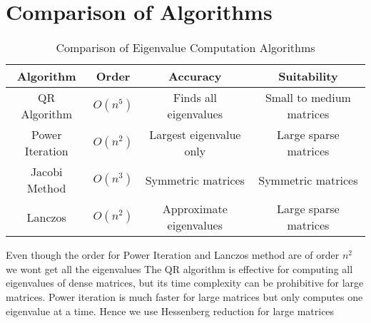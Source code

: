 \documentclass[journal]{IEEEtran}
\begin{document}
\section{\textbf{Comparison of Algorithms}}
\begin{table}[h]
\centering
\begin{tabular}{|c|c|c|c|}
\hline
\textbf{Algorithm} & \textbf{  Order  } & \textbf{Accuracy} & \textbf{Suitability} \\
\hline
QR Algorithm & \( O(n^5) \) & Finds all eigenvalues & Small to medium matrices \\
\hline
Power Iteration & \( O(n^2) \) & Largest eigenvalue only & Large sparse matrices \\
\hline
Jacobi Method & \( O(n^3) \) & Symmetric matrices & Symmetric matrices \\
\hline
Lanczos & \( O(n^2) \) & Approximate eigenvalues & Large sparse matrices \\
\hline
\end{tabular}
\caption{Comparison of Eigenvalue Computation Algorithms}
\end{table}
Even though the order for Power Iteration and Lanczos method are of order $n^2$ we wont get all the eigenvalues 
The QR algorithm is effective for computing all eigenvalues of dense matrices, but its time complexity can be prohibitive for large matrices. Power iteration is much faster for large matrices but only computes one eigenvalue at a time. Hence we use Hessenberg reduction for large matrices
\end{document}
